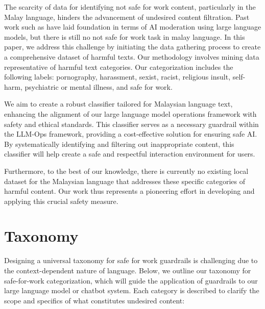 \documentclass[preprint]{article}
\begin{document}
The scarcity of data for identifying not safe for work content, particularly in the Malay language, hinders the advancement of undesired content filtration. Past work such as \cite{markov2023holistic,qiu2024facilitatingpornographictextdetection}  have laid foundation in terms of AI moderation using large language models, but there is still no not safe for work task in malay language. In this paper, we address this challenge by initiating the data gathering process to create a comprehensive dataset of harmful texts. Our methodology involves mining data representative of harmful text categories. Our categorization includes the following labels: pornography, harassment, sexist, racist, religious insult, self-harm, psychiatric or mental illness, and safe for work.

We aim to create a robust classifier tailored for Malaysian language text, enhancing the alignment of our large language model operations framework with safety and ethical standards. This classifier serves as a necessary guardrail within the LLM-Ops framework, providing a cost-effective solution for ensuring safe AI. By systematically identifying and filtering out inappropriate content, this classifier will help create a safe and respectful interaction environment for users.

Furthermore, to the best of our knowledge, there is currently no existing local dataset for the Malaysian language that addresses these specific categories of harmful content. Our work thus represents a pioneering effort in developing and applying this crucial safety measure.

\section{Taxonomy}

Designing a universal taxonomy for safe for work guardrails is challenging due to the context-dependent nature of language. Below, we outline our taxonomy for safe-for-work categorization, which will guide the application of guardrails to our large language model or chatbot system. Each category is described to clarify the scope and specifics of what constitutes undesired content:
\end{document}
